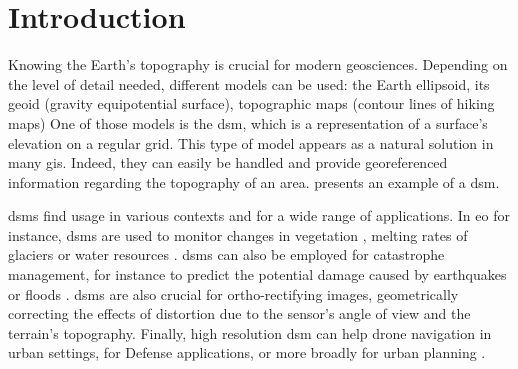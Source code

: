 \chapter*{Introduction}
Knowing the Earth's topography is crucial for modern geosciences. Depending on the level of detail needed, different models can be used: the Earth ellipsoid, its geoid (gravity equipotential surface), topographic maps (\ie contour lines of hiking maps) \etc One of those models is the \acrfull{dsm}, which is a representation of a surface's elevation on a regular grid. This type of model appears as a natural solution in many \acrfull{gis}. Indeed, they can easily be handled and provide georeferenced information regarding the topography of an area.  presents an example of a \acrshort{dsm}.

\acrshort{dsm}s find usage in various contexts and for a wide range of applications. In \acrfull{eo} for instance, \acrshort{dsm}s are used to monitor changes in vegetation \cite{sadeghi_canopy_2016}, melting rates of glaciers \cite{berthier_glacier_2014} or water resources \cite{yamazaki_merit_2019}. \acrshort{dsm}s can also be employed for catastrophe management, for instance to predict the potential damage caused by earthquakes or floods \cite{jenkins_physics-based_2023}. \acrshort{dsm}s are also crucial for ortho-rectifying images, \ie geometrically correcting the effects of distortion due to the sensor's angle of view and the terrain's topography. Finally, high resolution \acrshort{dsm} can help drone navigation in urban settings, for Defense applications, or more broadly for urban planning \cite{velazco_3d_2012}.

